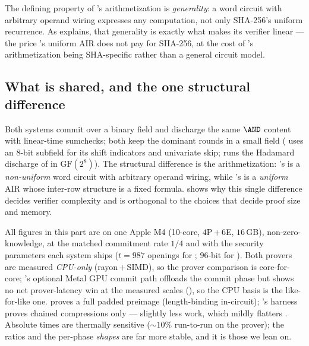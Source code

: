 The defining property of \binius{}'s arithmetization is \emph{generality}:
a word circuit with arbitrary operand wiring expresses any computation,
not only SHA-256's uniform recurrence. As  explains, that
generality is exactly what makes its verifier linear --- the price
\zinc{}'s uniform AIR does not pay for SHA-256, at the cost of \zinc{}'s
arithmetization being SHA-specific rather than a general circuit model.

\subsection{What is shared, and the one structural difference}

Both systems commit over a binary field and discharge the same $\AND$
content with linear-time sumchecks; both keep the dominant rounds in a
small field (\binius{} uses an $8$-bit subfield for its shift indicators
and univariate skip; \zinc{} runs the Hadamard discharge of
 in $\mathrm{GF}(2^8)$). The structural difference is
the arithmetization: \binius{}'s is a \emph{non-uniform} word circuit with
arbitrary operand wiring, while \zinc{}'s is a \emph{uniform} AIR whose
inter-row structure is a fixed formula.  shows why this
single difference decides verifier complexity and is orthogonal to the
choices that decide proof size and memory.

\begin{remark}
\label{rem:cmp-setup}
All figures in this part are on one Apple M4 (10-core, $4$P\,$+$\,$6$E,
$16$\,GB), non-zero-knowledge, at the matched commitment rate $1/4$ and
with the security parameters each system ships ($t=987$ openings for
\zinc{}; $96$-bit for \binius{}). Both provers are measured \emph{CPU-only}
(rayon\,$+$\,SIMD), so the prover comparison is core-for-core; \zinc{}'s
optional Metal GPU commit path offloads the commit phase but shows no net
prover-latency win at the measured scales (), so the
CPU basis is the like-for-like one.
\binius{} proves a full padded preimage (length-binding in-circuit);
\zinc{}'s harness proves chained compressions only --- slightly less work,
which mildly flatters \zinc{}. Absolute times are thermally sensitive
($\sim$$10\%$ run-to-run on the prover); the ratios and the per-phase
\emph{shapes} are far more stable, and it is those we lean on.
\end{remark}
